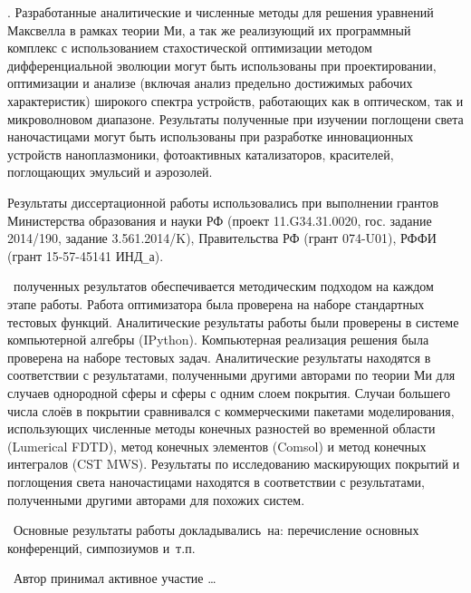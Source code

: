 \influence. Разработанные аналитические и численные методы для решения
уравнений Максвелла в рамках теории Ми, а так же реализующий их
программный комплекс с использованием стахостической оптимизации
методом дифференциальной эволюции могут быть использованы при
проектировании, оптимизации и анализе (включая анализ предельно
достижимых рабочих характеристик) широкого спектра устройств,
работающих как в оптическом, так и микроволновом диапазоне. Результаты
полученные при изучении поглощени света наночастицами могут быть
использованы при разработке инновационных устройств наноплазмоники,
фотоактивных катализаторов, красителей, поглощающих эмульсий и
аэрозолей.

Результаты диссертационной работы использовались при выполнении
грантов Министерства образования и науки РФ
(проект 11.G34.31.0020, гос. задание 2014/190, задание 3.561.2014/K),
Правительства РФ (грант 074-U01), РФФИ (грант 15-57-45141 ИНД\verb+_+а).


\reliability\ полученных результатов обеспечивается методическим
подходом на каждом этапе работы. Работа оптимизатора была проверена на
наборе стандартных тестовых функций. Аналитические результаты работы
были проверены в системе компьютерной алгебры (IPython). Компьютерная
реализация решения была проверена на наборе тестовых
задач. Аналитические результаты находятся в соответствии с
результатами, полученными другими авторами по теории Ми для случаев
однородной сферы и сферы с одним слоем покрытия.  Случаи большего
числа слоёв в покрытии сравнивался с коммерческими пакетами
моделирования, использующих численные методы конечных разностей во
временной области (Lumerical FDTD), метод конечных элементов (Comsol)
и метод конечных интегралов (CST MWS). Результаты по исследованию
маскирующих покрытий и поглощения света наночастицами находятся в
соответствии с результатами, полученными другими авторами для похожих
систем.

\probation\
Основные результаты работы докладывались~на:
перечисление основных конференций, симпозиумов и~т.\:п.

\contribution\ Автор принимал активное участие \ldots


